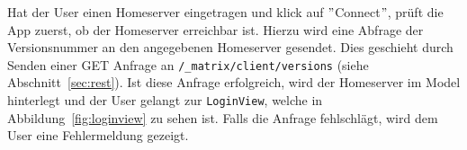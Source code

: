     Hat der User einen Homeserver eingetragen und klick auf \("\)Connect\("\), prüft die App zuerst, ob der Homeserver erreichbar ist.
    Hierzu wird eine Abfrage der Versionsnummer an den angegebenen Homeserver gesendet.
    Dies geschieht durch Senden einer GET Anfrage an \texttt{/\_matrix/client/versions} (siehe Abschnitt~\ref{sec:rest}).
    Ist diese Anfrage erfolgreich, wird der Homeserver im Model hinterlegt und der User gelangt zur \texttt{LoginView}, welche in Abbildung~\ref{fig:loginview} zu sehen ist.
    Falls die Anfrage fehlschlägt, wird dem User eine Fehlermeldung gezeigt.
